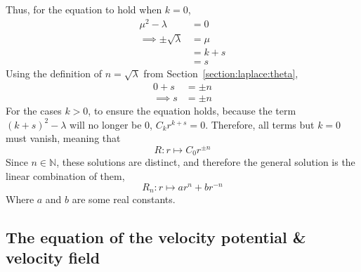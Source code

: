 Thus, for the equation to hold when $k=0$,
\begin{align*}
    \mu^2-\lambda&=0\\
    \implies\pm\sqrt{\lambda}&=\mu\\
    &=k+s\\
    &=s
\end{align*}
Using the definition of $n=\sqrt{\lambda}$ from Section~\ref{section:laplace:theta},
\begin{align*}
    0+s&=\pm n\\
    \implies s&=\pm n
\end{align*}
For the cases $k>0$, to ensure the equation holds, because the term $(k+s)^2-\lambda$ will no longer be $0$, $C_k r^{k+s}=0$. Therefore, all terms but $k=0$ must vanish, meaning that
$$
    R:r\mapsto C_0r^{\pm n}
$$
Since $n\in\mathbb{N}$, these solutions are distinct, and therefore the general solution is the linear combination of them,
\begin{equation}\label{equation:laplace-equation:8}
    R_n:r\mapsto ar^n+br^{-n}
\end{equation}
Where $a$ and $b$ are some real constants.

\subsection{The equation of the velocity potential \& velocity field}\label{section:THE-FORMULAE}
